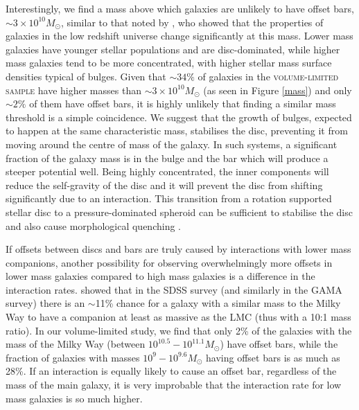 \documentclass[a4paper,fleqn,usenatbib,useAMS]{mnras}
\begin{document}
Interestingly, we find a mass above which galaxies are unlikely to have offset bars, $\sim$$ 3 \times10^{10} M_{\odot}$, similar to that noted by \citet{Kauffmann2003b}, who showed that the properties of galaxies in the low redshift universe change significantly at this mass. Lower mass galaxies have younger stellar populations and are disc-dominated, while higher mass galaxies tend to be more concentrated, with higher stellar mass surface densities typical of bulges. Given that $\sim$$34\%$ of galaxies in the \textsc{volume-limited sample} have higher masses than $ \sim $$3 \times10^{10} M_{\odot}$ (as seen in Figure \ref{mass}) and only $\sim$$2\%$ of them have offset bars, it is highly unlikely that finding a similar mass threshold is a simple coincidence. We suggest that the growth of bulges, expected to happen at the same characteristic mass, stabilises the disc, preventing it from moving around the centre of mass of the galaxy. In such systems, a significant fraction of the galaxy mass is in the bulge and the bar which will produce a steeper potential well. Being highly concentrated, the inner components will reduce the self-gravity of the disc and it will prevent the disc from shifting significantly due to an interaction. This transition from a rotation supported stellar disc to a pressure-dominated spheroid can be sufficient to stabilise the disc and also cause morphological quenching \citep{Martig2009, Kaviraj2014}.

If offsets between discs and bars are truly caused by interactions with lower mass companions, another possibility for observing overwhelmingly more offsets in lower mass galaxies compared to high mass galaxies is a difference in the interaction rates. \citet{Liu2011} showed that in the SDSS survey (and similarly \citet{Robotham2012} in the GAMA survey) there is an $\sim$11\% chance for a galaxy with a similar mass to the Milky Way to have a companion at least as massive as the LMC (thus with a 10:1 mass ratio). In our volume-limited study, we find that only 2\% of the galaxies with the mass of the Milky Way (between $10^{10.5}-10^{11.1} M_{\odot}$) have offset bars, while the fraction of galaxies with masses $10^{9}-10^{9.6} M_{\odot}$ having offset bars is as much as 28\%. If an interaction is equally likely to cause an offset bar, regardless of the mass of the main galaxy, it is very improbable that the interaction rate for low mass galaxies is so much higher.
\end{document}

